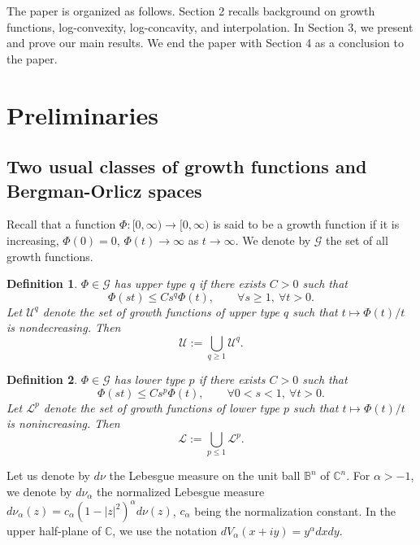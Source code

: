 \documentclass[12pt]{amsart}
\newtheorem{definition}{Definition}
\newcommand{\U}{\mathcal{U}}
\newcommand{\Lc}{\mathcal{L}}
\begin{document}
\medskip
The paper is organized as follows. Section 2 recalls background on growth functions, log-convexity, log-concavity, and interpolation. In Section 3, we present and prove our main results. We end the paper with Section 4 as a conclusion to the paper.

\section{Preliminaries}
\subsection{Two usual classes of growth functions and Bergman-Orlicz spaces}

Recall that a function $\Phi: [0,\infty) \to [0,\infty)$ is said to be a growth function if it is increasing, $\Phi(0)=0$, $\Phi(t)\to\infty$ as $t\to\infty$. We denote by $\mathcal{G}$ the set of all growth functions.

\begin{definition}\label{def:U}
$\Phi\in\mathcal{G}$ has upper type $q$ if there exists $C>0$ such that
\[
\Phi(st) \le C s^q \Phi(t), \qquad \forall s\ge 1,\ \forall t>0.
\]
Let $\U^q$ denote the set of growth functions of upper type $q$ such that $t\mapsto \Phi(t)/t$ is nondecreasing. Then
\[
\U := \bigcup_{q\ge 1} \U^q.
\]
\end{definition}

\begin{definition}\label{def:L}
$\Phi\in\mathcal{G}$ has lower type $p$ if there exists $C>0$ such that
\[
\Phi(st) \le C s^p \Phi(t), \qquad \forall 0<s<1,\ \forall t>0.
\]
Let ${\Lc}^p$ denote the set of growth functions of lower type $p$ such that $t\mapsto \Phi(t)/t$ is nonincreasing. Then
\[
\Lc := \bigcup_{p\le 1} {\Lc}^p.
\]
\end{definition}

Let us denote by $d\nu$ the Lebesgue measure on the unit ball $\mathbb B^n$ of $\mathbb C^n$. For $\alpha>-1$, we denote by $d\nu_{\alpha}$ the normalized Lebesgue measure $d\nu_{\alpha}(z)=c_{\alpha}(1-|z|^2)^{\alpha}d\nu(z)$, $c_\alpha$ being the normalization constant. In the upper half-plane of $\mathbb{C}$, we use the notation $dV_\alpha(x+iy)=y^\alpha dxdy$. 
\end{document}
